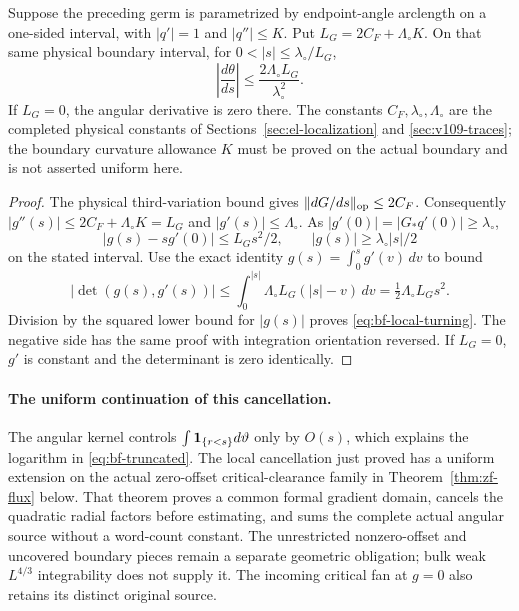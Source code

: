 \begin{proposition}
\label{prop:bf-local-turning}
Suppose the preceding germ is parametrized by endpoint-angle
arclength on a one-sided interval, with $|q'|=1$ and $|q''|\le K$.
Put $L_G=2C_F+\Lambda_\circ K$.  On that same physical boundary
interval, for $0<|s|\le\lambda_\circ/L_G$,
\begin{equation}\label{eq:bf-local-turning}
 \left|\frac{d\theta}{ds}\right|
       \le\frac{2\Lambda_\circ L_G}{\lambda_\circ^2}.
\end{equation}
If $L_G=0$, the angular derivative is zero there.  The constants
$C_F,\lambda_\circ,\Lambda_\circ$ are the completed physical
constants of Sections~\ref{sec:el-localization} and
\ref{sec:v109-traces}; the boundary curvature allowance $K$ must be
proved on the actual boundary and is not asserted uniform here.
\end{proposition}
\begin{proof}
The physical third-variation bound gives
$\|dG/ds\|_{\rm op}\le2C_F$.  Consequently
$|g''(s)|\le2C_F+\Lambda_\circ K=L_G$ and
$|g'(s)|\le\Lambda_\circ$.  As
$|g'(0)|=|G_*q'(0)|\ge\lambda_\circ$,
\[
 |g(s)-s g'(0)|\le L_Gs^2/2,\qquad
 |g(s)|\ge\lambda_\circ|s|/2
\]
on the stated interval.  Use the exact identity
$g(s)=\int_0^s g'(v)\,dv$ to bound
\[
 |\det(g(s),g'(s))|
 \le \int_0^{|s|}\Lambda_\circ L_G(|s|-v)\,dv
 =\tfrac12\Lambda_\circ L_Gs^2.
\]
Division by the squared lower bound for $|g(s)|$ proves
\eqref{eq:bf-local-turning}.  The negative side has the same proof
with integration orientation reversed.  If $L_G=0$, $g'$ is constant
and the determinant is zero identically.
\end{proof}

\paragraph{The uniform continuation of this cancellation.}
The angular kernel controls $\int\mathbf1_{\{r<s\}}d\vartheta$ only
by $O(s)$, which explains the logarithm in
\eqref{eq:bf-truncated}.  The local cancellation just proved has a
uniform extension on the actual zero-offset critical-clearance
family in Theorem~\ref{thm:zf-flux} below.  That theorem proves a
common formal gradient domain, cancels the quadratic radial factors
before estimating, and sums the complete actual angular source
without a word-count constant.  The unrestricted nonzero-offset and
uncovered boundary pieces remain a separate geometric obligation;
bulk weak $L^{4/3}$ integrability does not supply it.  The incoming
critical fan at $g=0$ also retains its distinct original source.


